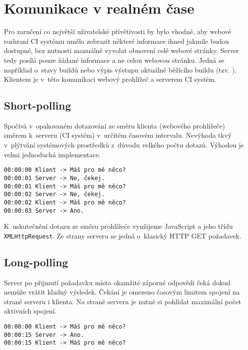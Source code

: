 \section{Komunikace v realném čase}

Pro zaručení co největší uživatelské přívětivosti by bylo vhodné, aby webové rozhraní CI systému umělo zobrazit některé informace ihned jakmile budou dostupné, bez nutnosti manuálně vyvolat obnovení celé webové stránky.
Server tedy posílá pouze žádané informace a ne celou webovou stránku.
Jedná se například o~stavy buildů nebo výpis výstupu aktuálně běžícího buildu (tzv. ).
Klientem je v~této komunikaci webový prohlížeč a serverem CI systém.

\subsection{Short-polling}

Spočívá v~opakovaném dotazování ze směru klienta (webového prohlížeče) směrem k~serveru (CI systém) v~určitém časovém intervalu.
Nevýhoda tkvý v~plýtvání systémových prostředků z~důvodu velkého počtu dotazů.
Výhodou je velmi jednoduchá implementace.

\begin{verbatim}
00:00:00 Klient -> Máš pro mě něco?
00:00:01 Server -> Ne, čekej.
00:00:01 Klient -> Máš pro mě něco?
00:00:02 Server -> Ne, čekej.
00:00:02 Klient -> Máš pro mě něco?
00:00:03 Server -> Ano.
\end{verbatim}

K~uskutečnění dotazu ze směru prohlížeče využijeme JavaScript a jeho třídu \verb|XMLHttpRequest|.
Ze strany serveru se jedná o~klasický HTTP GET požadavek.

\subsection{Long-polling}

Server po přijmutí požadavku místo okamžité záporné odpovědi čeká dokud nemůže vrátit kladný výsledek.
Čekání je omezeno časovým limitem spojení na straně serveru i klienta.
Na straně serveru je nutné si pohlídat maximální počet aktivních spojení.

\begin{verbatim}
00:00:00 Klient -> Máš pro mě něco?
00:00:15 Server -> Ano.
00:00:15 Klient -> Máš pro mě něco?
\end{verbatim}

